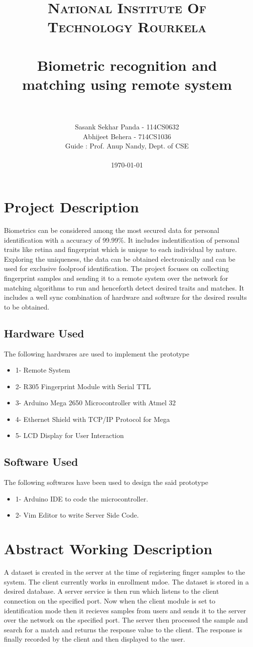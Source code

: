 \documentclass[paper=a4, fontsize=11pt]{scrartcl}
\title{
		\usefont{OT1}{bch}{b}{n}
		\normalfont \normalsize \textsc{National Institute Of Technology Rourkela} \\ [25pt]
		\horrule{0.5pt} \\[0.4cm]
		\huge Biometric recognition and matching using remote system\\
		\horrule{2pt} \\[0.5cm]
}
\author{
		\normalfont 								
        Sasank Sekhar Panda - 114CS0632\\[-3pt] 
        Abhijeet Behera	- 714CS1036\\[-3pt]	
        Guide : Prof. Anup Nandy, Dept. of CSE\\
        \\
        \today
}
\date{}
\numberwithin{equation}{section}		%
\numberwithin{figure}{section}			%
\numberwithin{table}{section}				%
\begin{document}
\maketitle
\section{Project Description}
Biometrics can be considered among the most secured data for personal identification with a accuracy of 99.99\%. It includes indentification of personal traits like retina and fingerprint which is unique to each individual by nature. Exploring the uniqueness, the data can be obtained electronically and can be used for exclusive foolproof identification. The project focuses on collecting fingerprint samples and sending it to a remote system over the network for matching algorithms to run and henceforth detect desired traits and matches. It includes a well sync combination of hardware and software for the desired results to be obtained.



\subsection{Hardware Used}
The following hardwares are used to implement the prototype
\begin{itemize}
	\item1- Remote System
    \item2- R305 Fingerprint Module with Serial TTL 
    \item3- Arduino Mega 2650 Microcontroller with Atmel 32
    \item4- Ethernet Shield with TCP/IP Protocol for Mega
    \item5- LCD Display for User Interaction
    
\end{itemize}
\subsection{Software Used}
The following softwares have been used to design the said prototype
\begin{itemize}
	\item1- Arduino IDE to code the microcontroller.
    \item2- Vim Editor to write Server Side Code.
    
\end{itemize}



\section{Abstract Working Description}
\begin{paragraph}
A dataset is created in the server at the time of registering finger samples to the system. The client currently works in enrollment mdoe. The dataset is stored in a desired database. A server service is then run which listens to the client connection on the specified port. Now when  the client module is set to identification mode then it recieves samples from users and sends it to the server over the network on the specified port. The server then processed the sample and search for a match and returns the response value to the client. The response is finally recorded by the client and then displayed to the user.
\end{paragraph}
\end{document}
